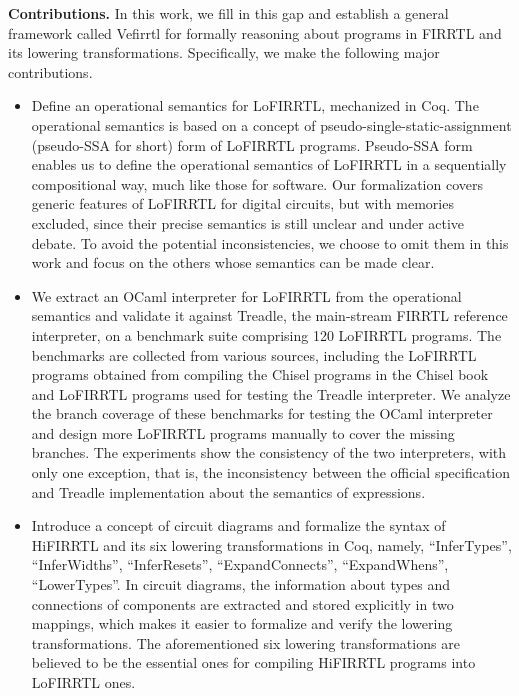 \smallskip
\noindent
{\bf Contributions.}
In this work, we fill in this gap and establish a general framework called Vefirrtl for formally reasoning about programs in FIRRTL and its lowering transformations. Specifically, we make the following major contributions.
\begin{itemize}
\item Define an operational semantics for LoFIRRTL, mechanized in Coq. The operational semantics is based on a concept of pseudo-single-static-assignment (pseudo-SSA for short) form of LoFIRRTL programs. Pseudo-SSA form enables us to define the operational semantics of LoFIRRTL in a sequentially compositional way, much like those for software. Our formalization covers generic features of LoFIRRTL for digital circuits, but with memories excluded, since their precise semantics is still unclear and under active debate. To avoid the potential inconsistencies, we choose to omit them in this work and focus on the others whose semantics can be made clear. 
%
\item We extract an OCaml interpreter for LoFIRRTL from the operational semantics and validate it against Treadle, the main-stream FIRRTL reference interpreter, on a benchmark suite comprising 120 LoFIRRTL programs. The benchmarks are  collected from various sources, including the LoFIRRTL programs obtained from compiling the Chisel programs in the Chisel book and LoFIRRTL programs used for testing the Treadle interpreter. We analyze the branch coverage of these benchmarks for testing the OCaml interpreter and design more  LoFIRRTL programs manually to cover the missing branches. The experiments show the consistency of the two interpreters, with only one exception, that is,  the inconsistency between the official specification and Treadle implementation about the semantics of  expressions.
%
\item Introduce a concept of circuit diagrams and formalize the syntax of HiFIRRTL and its six lowering transformations in Coq, namely, ``InferTypes'', ``InferWidths'', ``InferResets'', ``ExpandConnects'', ``ExpandWhens'', ``LowerTypes''. In circuit diagrams, the information about types and connections of components are extracted and stored explicitly in two mappings, which makes it easier to formalize and verify the lowering transformations.  
The aforementioned six lowering transformations are believed to be the essential ones for compiling HiFIRRTL programs into LoFIRRTL ones. 

\end{itemize}

